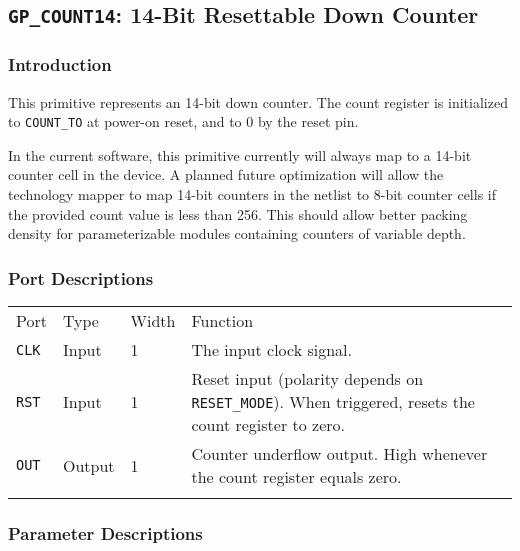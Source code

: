 \documentclass[11pt]{article}
\newcommand{\tokenstyle}[1]{\texttt{#1}}
\newcommand{\whenstyle}[1]{{\fontseries{sb}\selectfont#1}}
\newcommand{\thinhline}{\Xhline{1\arrayrulewidth}}
\newcommand{\thickhline}{\Xhline{2.5\arrayrulewidth}}
\begin{document}

\pagebreak
\subsection{\tokenstyle{GP\_COUNT14}: 14-Bit Resettable Down Counter}
\label{gp-count14}

\subsubsection{Introduction}
This primitive represents an 14-bit down counter. The count register is initialized to \tokenstyle{COUNT\_TO} at 
power-on reset, and to 0 by the reset pin.

In the current software, this primitive currently will always map to a 14-bit counter cell in the device. A planned
future optimization will allow the technology mapper to map 14-bit counters in the netlist to 8-bit counter cells if
the provided count value is less than 256. This should allow better packing density for parameterizable modules
containing counters of variable depth.

\subsubsection{Port Descriptions}

\begin{tabularx}{\textwidth}{lllX}
\thinhline
\whenstyle{Port} & \whenstyle{Type} & \whenstyle{Width} & \whenstyle{Function} \\
\thickhline
\tokenstyle{CLK} & Input & 1 & The input clock signal. \\
\thinhline
\tokenstyle{RST} & Input & 1 & Reset input (polarity depends on \tokenstyle{RESET\_MODE}). When triggered, resets the count register to zero. \\
\thinhline
\tokenstyle{OUT} & Output & 1 & Counter underflow output. High whenever the count register equals zero. \\
\thinhline
\end{tabularx}

\subsubsection{Parameter Descriptions}
\end{document}
